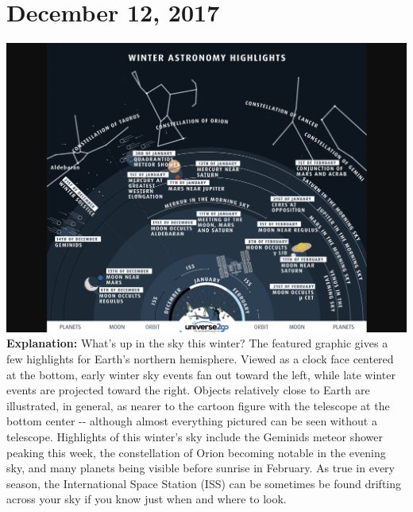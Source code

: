 \documentclass{article}%
\begin{document}
\section*{December 12, 2017}%
\includegraphics[width=\textwidth]{../lib/pictures/171212.jpg}%
\textbf{\newline%
\newline%
Explanation:\newline%
}%
    What's  up in the sky this winter?   The featured graphic gives a few highlights for Earth's northern hemisphere.   Viewed as a clock face centered at the bottom,  early winter sky events fan out toward the left,  while late winter events are projected toward the right.   Objects relatively close to  Earth are illustrated, in general, as nearer to the cartoon figure with the telescope at the bottom center {-}{-} although almost everything pictured can be  seen without a telescope.   Highlights of this winter's sky include the  Geminids meteor shower peaking this week, the  constellation of Orion becoming notable in the evening sky, and  many planets being visible before sunrise in February.   As true in every season, the  International Space Station  (ISS) can be  sometimes be found  drifting across your sky if you know just when and where to look.%
\newpage

%
\end{document}
